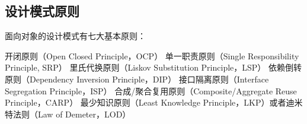 \documentclass[../../../interview-questions.tex]{subfiles}
\begin{document}
\subsection{设计模式原则}

面向对象的设计模式有七大基本原则：

开闭原则（Open Closed Principle，OCP）
单一职责原则（Single Responsibility Principle, SRP）
里氏代换原则（Liskov Substitution Principle，LSP）
依赖倒转原则（Dependency Inversion Principle，DIP）
接口隔离原则（Interface Segregation Principle，ISP）
合成/聚合复用原则（Composite/Aggregate Reuse Principle，CARP）
最少知识原则（Least Knowledge Principle，LKP）或者迪米特法则（Law of  Demeter，LOD）
\end{document}
